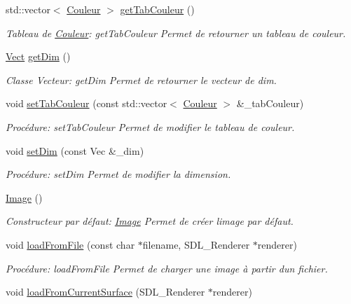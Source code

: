 \begin{DoxyCompactItemize}
std\+::vector$<$ \hyperlink{classCouleur}{Couleur} $>$ \hyperlink{classImage_a61a9499054fb7982ca74f7e408617df5}{get\+Tab\+Couleur} ()
\begin{DoxyCompactList}\small\item\em Tableau de \hyperlink{classCouleur}{Couleur}\+: get\+Tab\+Couleur Permet de retourner un tableau de couleur. \end{DoxyCompactList}\item 
\hyperlink{classVect}{Vect} \hyperlink{classImage_a19886e6e2f661123224101aebdab0659}{get\+Dim} ()
\begin{DoxyCompactList}\small\item\em Classe Vecteur\+: get\+Dim Permet de retourner le vecteur de dim. \end{DoxyCompactList}\item 
void \hyperlink{classImage_a17feecebcbde65970ffa419ba9f0465a}{set\+Tab\+Couleur} (const std\+::vector$<$ \hyperlink{classCouleur}{Couleur} $>$ \&\+\_\+tab\+Couleur)
\begin{DoxyCompactList}\small\item\em Procédure\+: set\+Tab\+Couleur Permet de modifier le tableau de couleur. \end{DoxyCompactList}\item 
void \hyperlink{classImage_a9561b601b84ece813a9b87b881b8fc24}{set\+Dim} (const Vec \&\+\_\+dim)
\begin{DoxyCompactList}\small\item\em Procédure\+: set\+Dim Permet de modifier la dimension. \end{DoxyCompactList}\item 
\hyperlink{classImage_a58edd1c45b4faeb5f789b0d036d02313}{Image} ()
\begin{DoxyCompactList}\small\item\em Constructeur par défaut\+: \hyperlink{classImage}{Image} Permet de créer l\textquotesingle{}image par défaut. \end{DoxyCompactList}\item 
void \hyperlink{classImage_aa276b5183099671ddeaf8f083068046c}{load\+From\+File} (const char $\ast$filename, S\+D\+L\+\_\+\+Renderer $\ast$renderer)
\begin{DoxyCompactList}\small\item\em Procédure\+: load\+From\+File Permet de charger une image à partir d\textquotesingle{}un fichier. \end{DoxyCompactList}\item 
void \hyperlink{classImage_aee71e67e123b6fdd1d3c91caa2892792}{load\+From\+Current\+Surface} (S\+D\+L\+\_\+\+Renderer $\ast$renderer)

\end{DoxyCompactItemize}
